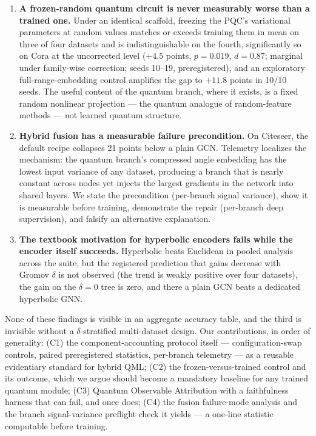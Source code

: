 \documentclass[pdflatex,sn-mathphys-num]{sn-jnl}
\begin{document}
\begin{enumerate}
\item \textbf{A frozen-random quantum circuit is never measurably worse than a trained one.} Under an identical scaffold, freezing the PQC's variational parameters at random values matches or exceeds training them in mean on three of four datasets and is indistinguishable on the fourth, significantly so on Cora at the uncorrected level ($+4.5$ points, $p=0.019$, $d=0.87$; marginal under family-wise correction; seeds 10--19, preregistered), and an exploratory full-range-embedding control amplifies the gap to $+11.8$ points in 10/10 seeds. The useful content of the quantum branch, where it exists, is a fixed random nonlinear projection --- the quantum analogue of random-feature methods --- not learned quantum structure.
\item \textbf{Hybrid fusion has a measurable failure precondition.} On Citeseer, the default recipe collapses 21 points below a plain GCN. Telemetry localizes the mechanism: the quantum branch's compressed angle embedding has the lowest input variance of any dataset, producing a branch that is nearly constant across nodes yet injects the largest gradients in the network into shared layers. We state the precondition (per-branch signal variance), show it is measurable before training, demonstrate the repair (per-branch deep supervision), and falsify an alternative explanation.
\item \textbf{The textbook motivation for hyperbolic encoders fails while the encoder itself succeeds.} Hyperbolic beats Euclidean in pooled analysis across the suite, but the registered prediction that gains decrease with Gromov $\delta$ is not observed (the trend is weakly positive over four datasets), the gain on the $\delta=0$ tree is zero, and there a plain GCN beats a dedicated hyperbolic GNN.
\end{enumerate}

None of these findings is visible in an aggregate accuracy table, and the third is invisible without a $\delta$-stratified multi-dataset design. Our contributions, in order of generality: (C1) the component-accounting protocol itself --- configuration-swap controls, paired preregistered statistics, per-branch telemetry --- as a reusable evidentiary standard for hybrid QML; (C2) the frozen-versus-trained control and its outcome, which we argue should become a mandatory baseline for any trained quantum module; (C3) Quantum Observable Attribution with a faithfulness harness that can fail, and once does; (C4) the fusion failure-mode analysis and the branch signal-variance preflight check it yields --- a one-line statistic computable before training.
\end{document}
